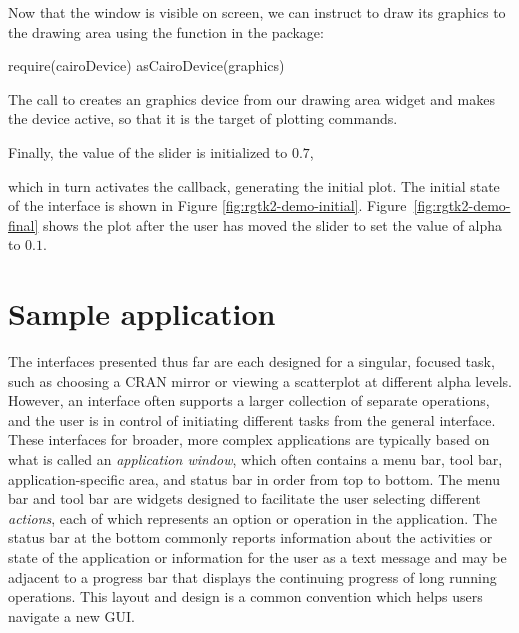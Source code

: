 \documentclass[article,shortnames]{jss}
\begin{document}
Now that the window is visible on screen, we can instruct 
to draw its graphics to the drawing area using the
 function in the  package:
\begin{Code}
require(cairoDevice)
asCairoDevice(graphics)
\end{Code}
The call to  creates an  graphics
device from our drawing area widget and makes the device active, so
that it is the target of  plotting commands.

Finally, the value of the slider is initialized to $0.7$,
which in turn activates the callback, generating the initial plot. The
initial state of the interface is shown in Figure
\ref{fig:rgtk2-demo-initial}.  Figure~\ref{fig:rgtk2-demo-final} shows
the plot after the user has moved the slider to set the value of alpha
to $0.1$.


\section{Sample application}\label{sec:spreadsheet-example}

The interfaces presented thus far are each designed for a singular,
focused task, such as choosing a CRAN mirror or viewing a scatterplot
at different alpha levels.  However, an interface often supports a
larger collection of separate operations, and the user is in control
of initiating different tasks from the general interface. These
interfaces for broader, more complex
applications are typically based on what is called an
\emph{application window}, which often contains a menu bar, tool bar,
application-specific area, and status bar in order from top to
bottom. The menu bar and tool bar are widgets designed to facilitate
the user selecting different \emph{actions}, each of which represents
an option or operation in the application.  The status bar at the
bottom commonly reports information about the activities or state of
the application or information for the user as a text message and may
be adjacent to a progress bar that displays the continuing progress of
long running operations.  This layout and design is a common
convention which helps users navigate a new GUI.
\end{document}
